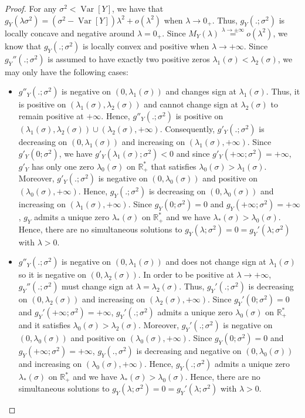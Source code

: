 \documentclass[a4paper, 10pt]{article}
\theoremstyle{definition}
\begin{document}
\begin{proof}For any $\sigma^2<\operatorname{Var}[Y]$, we have that $g_Y(\lambda\sigma^2)=(\sigma^2-\operatorname{Var}[Y])\lambda^2+o(\lambda^2)$ when $\lambda\to 0_+$. Thus, $g_Y(.;\sigma^2)$ is locally concave and negative around $\lambda=0_+$. Since  $M_Y(\lambda)\overset{\lambda\to \pm\infty}{=}o(\lambda^2)$, we know that $g_Y(.;\sigma^2)$ is locally convex and positive when $\lambda\to +\infty$. Since $g_Y''(.;\sigma^2)$ is assumed to have exactly two positive zeros $\lambda_1(\sigma)<\lambda_2(\sigma)$, we may only have the following cases:
\begin{itemize}
    \item $g''_Y(.;\sigma^2)$ is negative on $(0,\lambda_1(\sigma))$ and changes sign at $\lambda_1(\sigma)$. Thus, it is positive on $(\lambda_1(\sigma),\lambda_2(\sigma))$ and cannot change sign at $\lambda_2(\sigma)$ to remain positive at $+\infty$. Hence, $g''_Y(.;\sigma^2)$ is positive on $(\lambda_1(\sigma),\lambda_2(\sigma))\cup (\lambda_2(\sigma),+\infty)$. Consequently, $g'_Y(.;\sigma^2)$ is decreasing on $(0,\lambda_1(\sigma))$ and increasing on $(\lambda_1(\sigma),+\infty)$. Since $g'_Y(0;\sigma^2)$, we have $g'_Y(\lambda_1(\sigma);\sigma^2)<0$ and since $g'_Y(+\infty;\sigma^2)=+\infty$, $g'_Y$ has only one zero $\lambda_0(\sigma)$ on $\mathbb{R}_+^*$ that satisfies $\lambda_0(\sigma)>\lambda_1(\sigma)$. Moreover, $g'_Y(.;\sigma^2)$ is negative on $(0,\lambda_0(\sigma))$ and positive on $(\lambda_0(\sigma),+\infty)$. Hence, $g_Y(.;\sigma^2)$ is decreasing on $(0,\lambda_0(\sigma))$ and increasing on $(\lambda_1(\sigma),+\infty)$. Since $g_Y(0;\sigma^2)=0$ and $g_Y(+\infty;\sigma^2)=+\infty$, $g_Y$ admits a unique zero $\lambda_*(\sigma)$ on $\mathbb{R}_+^*$ and we have $\lambda_*(\sigma)>\lambda_0(\sigma)$. Hence, there are no simultaneous solutions to $g_Y(\lambda;\sigma^2)=0=g_Y'(\lambda;\sigma^2)$ with $\lambda>0$.
    \item $g''_Y(.;\sigma^2)$ is negative on $(0,\lambda_1(\sigma))$ and does not change sign at $\lambda_1(\sigma)$ so it is negative on $(0,\lambda_2(\sigma))$. In order to be positive at $\lambda\to +\infty$, $g_Y''(.;\sigma^2)$ must change sign at $\lambda=\lambda_2(\sigma)$. Thus, $g_Y'(.;\sigma^2)$ is decreasing on $(0,\lambda_2(\sigma))$ and increasing on $(\lambda_2(\sigma),+\infty)$. Since $g_Y'(0;\sigma^2)=0$ and $g_Y'(+\infty;\sigma^2)=+\infty$, $g_Y'(.;\sigma^2)$ admits a unique zero $\lambda_0(\sigma)$ on $\mathbb{R}_+^*$ and it satisfies $\lambda_0(\sigma)>\lambda_2(\sigma)$. Moreover, $g_Y'(.;\sigma^2)$ is negative on $(0,\lambda_0(\sigma))$ and positive on $(\lambda_0(\sigma),+\infty)$. Since $g_Y(0;\sigma^2)=0$ and $g_Y(+\infty;\sigma^2)=+\infty$, $g_Y(.,\sigma^2)$ is decreasing and negative on $(0,\lambda_0(\sigma))$ and increasing on $(\lambda_0(\sigma),+\infty)$. Hence, $g_Y(.;\sigma^2)$ admits a unique zero $\lambda_*(\sigma)$ on $\mathbb{R}_+^*$ and we have $\lambda_*(\sigma)>\lambda_0(\sigma)$. Hence, there are no simultaneous solutions to $g_Y(\lambda;\sigma^2)=0=g_Y'(\lambda;\sigma^2)$ with $\lambda>0$.
\end{itemize}
\end{proof}
\end{document}
